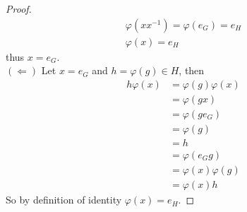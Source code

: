 \documentclass[12pt]{article}
\begin{document}
\begin{enumerate}[label=\textbf{\arabic*}.]
\begin{proof}
\begin{align*}
                \varphi(xx^{-1}) = \varphi(e_G) = e_H \\
                \varphi(x) = e_H
            \end{align*}
            thus $x = e_G$. \\
            $(\Leftarrow)$ Let $x = e_G$ and $h = \varphi(g) \in H$, then
            \begin{align*}
                h\varphi(x) &= \varphi(g)\varphi(x) \\
                            &= \varphi(gx) \\
                            &= \varphi(ge_G) \\
                            &= \varphi(g) \\
                            &= h \\
                            &= \varphi(e_Gg) \\
                            &= \varphi(x)\varphi(g) \\
                            &= \varphi(x)h
            \end{align*}
            So by definition of identity $\varphi(x) = e_H$.
	      \end{proof}
\end{enumerate}
\end{document}

